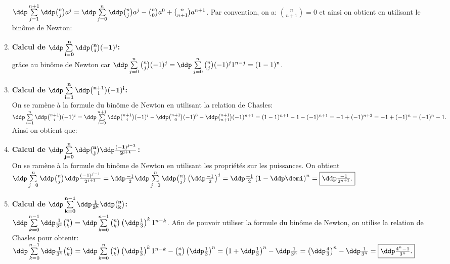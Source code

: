 \begin{correction}
\begin{enumerate}
$\ddp \sum\limits_{j=1}^{n+1}\ddp \binom{n}{j}a^j=\ddp \sum\limits_{j=0}^{n}\ddp \binom{n}{j}a^j-\binom{n}{0}a^0+\binom{n}{n+1}a^{n+1}$. Par convention, on a: $\binom{n}{n+1}=0$ et ainsi on obtient en utilisant le bin\^{o}me de Newton: 
\item  \textbf{Calcul de $\mathbf{\ddp \sum\limits_{i=0}^{n}\ddp \binom{n}{i}(-1)^{i}}$:}\\
\noindent \noindent {} gr\^ace au bin\^{o}me de Newton car $\ddp \sum\limits_{j=0}^n\binom{n}{j}(-1)^j=\ddp \sum\limits_{j=0}^n\binom{n}{j}(-1)^j 1^{n-j}=(1-1)^n$.
\item  \textbf{Calcul de $\mathbf{\ddp \sum\limits_{i=1}^{n}\ddp \binom{n+1}{i}(-1)^{i}}$:}\\
\noindent On se ram\`{e}ne \`{a} la formule du bin\^{o}me de Newton en utilisant la relation de Chasles: 
$\ddp \sum\limits_{i=1}^{n}\ddp \binom{n+1}{i}(-1)^{i}=\ddp \sum\limits_{i=0}^{n+1}\ddp \binom{n+1}{i}(-1)^{i}-\ddp \binom{n+1}{0}(-1)^{0}-\ddp \binom{n+1}{n+1}(-1)^{n+1}=(1-1)^{n+1}-1-(-1)^{n+1}=-1+(-1)^{n+2}=-1+(-1)^n=(-1)^n-1.$ Ainsi on obtient que: 
\item  \textbf{Calcul de $\mathbf{\ddp \sum\limits_{j=0}^n\ddp \binom{n}{j}  \ddp\frac{(-1)^{j-1}}{2^{j+1}}}$:}\\
\noindent On se ram\`{e}ne \`{a} la formule du bin\^{o}me de Newton en utilisant les propri\'et\'es sur les puissances. On obtient
$\ddp \sum\limits_{j=0}^n\ddp \binom{n}{j}  \ddp\frac{(-1)^{j-1}}{2^{j+1}}=\ddp\frac{-1}{2}\ddp \sum\limits_{j=0}^n\ddp \binom{n}{j} \left( \ddp\frac{-1}{2}\right)^j=\ddp\frac{-1}{2} \left(  1-\ddp\demi \right)^n=\fbox{$ \ddp\frac{-1}{2^{n+1}}  $.}$
\item  \textbf{Calcul de $\mathbf{\ddp \sum\limits_{k=0}^{n-1} \ddp\frac{1}{3^k}\ddp \binom{n}{k}}$:}\\
\noindent $\ddp \sum\limits_{k=0}^{n-1} \ddp\frac{1}{3^k}\binom{n}{k}=\ddp \sum\limits_{k=0}^{n-1}\binom{n}{k}\left( \ddp\frac{1}{3}\right)^k1^{n-k}$. Afin de pouvoir utiliser la formule du bin\^{o}me de Newton, on utilise la relation de Chasles pour obtenir:
$\ddp \sum\limits_{k=0}^{n-1} \ddp\frac{1}{3^k}\binom{n}{k}=\ddp \sum\limits_{k=0}^{n}\binom{n}{k}\left( \ddp\frac{1}{3}\right)^k1^{n-k}-\binom{n}{n}\left( \ddp\frac{1}{3}\right)^n=\left( 1+\ddp\frac{1}{3} \right)^n- \ddp\frac{1}{3^n}=\left(\ddp\frac{4}{3} \right)^n- \ddp\frac{1}{3^n}=\fbox{$\ddp\frac{4^n-1}{3^n}.$}$
\end{enumerate}
\end{correction}